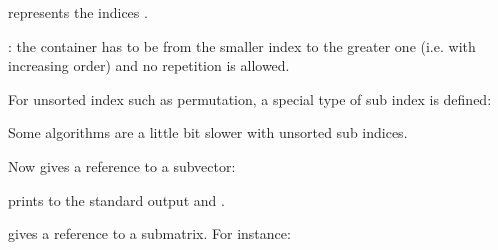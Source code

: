 \documentclass[a4paper,11pt,english]{sphinxmanual}
\begin{document}
represents the indices .

 : the container  has to be  from the smaller index to the greater one (i.e. with increasing order) and no repetition is allowed.

For unsorted index such as permutation, a special type of sub index is defined:

\begin{sphinxVerbatim}[commandchars=\\\{\}]
 
\end{sphinxVerbatim}

Some algorithms are a little bit slower with unsorted sub indices.

Now  gives a reference to a sub\sphinxhyphen{}vector:

\begin{sphinxVerbatim}[commandchars=\\\{\}]
 
\PYG{p}{[}\PYG{p}{]}  
      
\end{sphinxVerbatim}

prints to the standard output  and .

 gives a reference to a sub\sphinxhyphen{}matrix. For instance:
\end{document}
